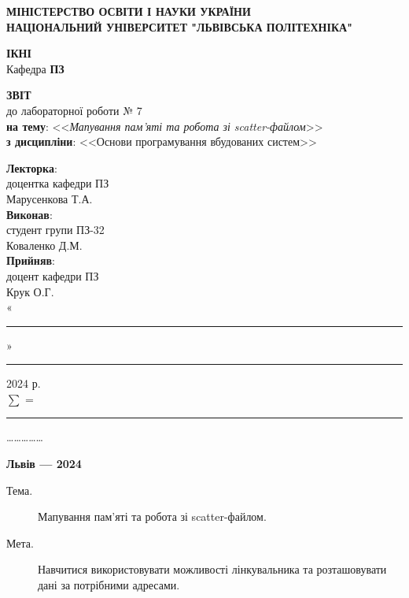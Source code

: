 \documentclass[oneside,14pt]{extarticle}
\newcommand\subject{Основи програмування вбудованих систем}
\newcommand\lecturer{доцентка кафедри ПЗ\\Марусенкова Т.А.}
\newcommand\teacher{доцент кафедри ПЗ\\Крук О.Г.}
\newcommand\mygroup{ПЗ-32}
\newcommand\lab{7}
\newcommand\theme{Мапування пам'яті та робота зі scatter-файлом}
\newcommand\purpose{Навчитися використовувати можливості лінкувальника та розташовувати дані за потрібними адресами}
\begin{document}
\begin{normalsize}
	\begin{titlepage}
		\thispagestyle{empty}
		\begin{center}
			\textbf{МІНІСТЕРСТВО ОСВІТИ І НАУКИ УКРАЇНИ\\
				НАЦІОНАЛЬНИЙ УНІВЕРСИТЕТ "ЛЬВІВСЬКА ПОЛІТЕХНІКА"}
		\end{center}
		\begin{flushright}
			\textbf{ІКНІ}\\
			Кафедра \textbf{ПЗ}
		\end{flushright}
		\vspace{80pt}
		\begin{center}
			\textbf{ЗВІТ}\\
			\vspace{10pt}
			до лабораторної роботи № \lab\\
			\textbf{на тему}: <<\textit{\theme}>>\\
			\textbf{з дисципліни}: <<\subject>>
		\end{center}
		\vspace{80pt}
		\begin{flushright}
			
			\textbf{Лекторка}:\\
			\lecturer\\
			\vspace{28pt}
			\textbf{Виконав}:\\
			
			студент групи \mygroup\\
			Коваленко Д.М.\\
			\vspace{28pt}
			\textbf{Прийняв}:\\
			
			\teacher\\
			
			\vspace{28pt}
			«\rule{1cm}{0.15mm}» \rule{1.5cm}{0.15mm} 2024 р.\\
			$\sum$ = \rule{1cm}{0.15mm}……………\\
			
		\end{flushright}
		\vspace{\fill}
		\begin{center}
			\textbf{Львів — 2024}
		\end{center}
	\end{titlepage}
		
	\begin{description}
		\item[Тема.] \theme.
		\item[Мета.] \purpose.
	\end{description}


\end{normalsize}
\end{document}
